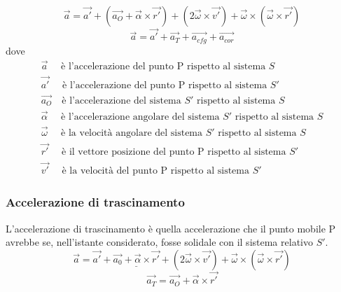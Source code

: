 \documentclass[twoside]{article}
\begin{document}
\begin{equation}
  \boxed{\vec{a} = \vec{a'} + \left(\vec{a_O} + \vec{\alpha} \times \vec{r'}\right) + \left(2 \vec{\omega} \times \vec{v'}\right) + \vec{\omega} \times \left(\vec{\omega} \times \vec{r'}\right)}
\end{equation}
\begin{equation*}
  \boxed{\vec{a} = \vec{a'} + \vec{a_T} + \vec{a_{cfg}} + \vec{a_{cor}}}
\end{equation*}
dove
\begin{align*}
   & \vec{a}      \quad \text{ è l'accelerazione del punto P rispetto al sistema } S                       & \\
   & \vec{a'}      \quad \text{ è l'accelerazione del punto P rispetto al sistema } S'                     & \\
   & \vec{a_O}     \quad \text{è l'accelerazione del sistema } S' \text{ rispetto al sistema } S           & \\
   & \vec{\alpha}  \quad \text{ è l'accelerazione angolare del sistema } S' \text{ rispetto al sistema } S & \\
   & \vec{\omega}  \quad \text{ è la velocità angolare del sistema } S' \text{ rispetto al sistema } S     & \\
   & \vec{r'}      \quad \text{ è il vettore posizione del punto P rispetto al sistema } S'                & \\
   & \vec{v'}      \quad \text{ è la velocità del punto P rispetto al sistema } S'
\end{align*}
\subsubsection{Accelerazione di trascinamento}
L'accelerazione di trascinamento è quella accelerazione che il punto mobile P avrebbe se, nell'istante considerato, fosse solidale con il sistema relativo $S'$.
\begin{equation}
  \vec{a} = \vec{a'} + \underline{\vec{a_0} + \vec{\alpha} \times \vec{r'}} + \left(2 \vec{\omega} \times \vec{v'}\right) + \vec{\omega} \times \left(\vec{\omega} \times \vec{r'}\right)
\end{equation}
\begin{equation}
  \boxed{\vec{a_T} = \vec{a_O} + \vec{\alpha} \times \vec{r'}}
\end{equation}
\end{document}

